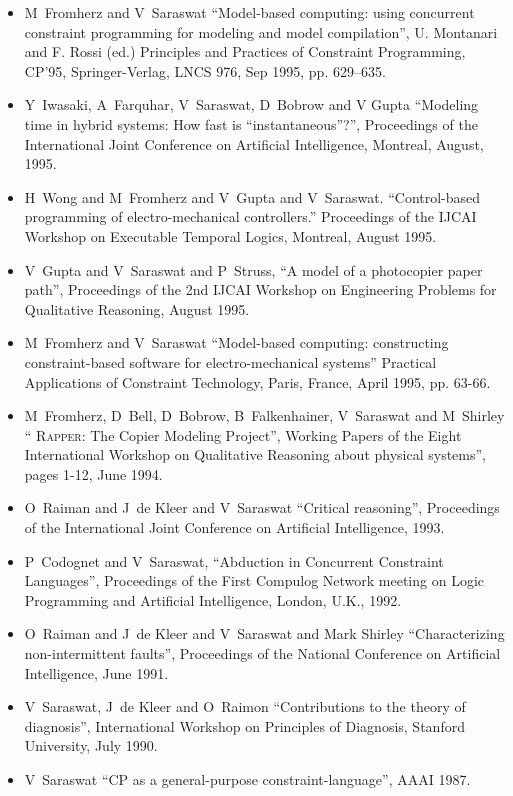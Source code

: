 \documentclass{article}
\begin{document}
\begin{itemize}
\item  M~Fromherz and V~Saraswat   ``Model-based
  computing: using concurrent constraint programming for modeling
  and model compilation'', U. Montanari  and F. Rossi (ed.)
  Principles and Practices of Constraint Programming, CP'95,
  Springer-Verlag, LNCS 976, Sep 1995, pp. 629--635. 

\item  Y~Iwasaki, A~Farquhar, V~Saraswat, D~Bobrow
  and V Gupta ``Modeling time in hybrid systems: How fast is
  ``instantaneous''?'', Proceedings of the International Joint
  Conference on Artificial Intelligence, Montreal, August, 1995.

\item H~Wong and M~Fromherz and V~Gupta and
  V~Saraswat. ``Control-based programming of electro-mechanical 
  controllers.'' Proceedings of the IJCAI Workshop on Executable
  Temporal Logics, Montreal, August 1995.

\item  V~Gupta and V~Saraswat and P~Struss, ``A model
  of a photocopier paper path'', Proceedings of the 2nd IJCAI
  Workshop on Engineering Problems for Qualitative Reasoning,
  August 1995.
  
\item  M~Fromherz and V~Saraswat ``Model-based
  computing: constructing constraint-based software for
  electro-mechanical systems'' Practical Applications of
  Constraint Technology, Paris, France, April 1995, pp. 63-66.

\item M~Fromherz, D~Bell, D~Bobrow, B~Falkenhainer, V~Saraswat and
  M~Shirley ``\textsc{ Rapper}: The Copier Modeling Project'', Working
  Papers of the Eight International Workshop on Qualitative Reasoning
  about physical systems'', pages 1-12, June 1994. 

\item O~Raiman and J~de Kleer and V~Saraswat ``Critical
  reasoning'', Proceedings of the International Joint Conference on
  Artificial Intelligence, 1993.

\item P~Codognet and V~Saraswat, ``Abduction in Concurrent
  Constraint Languages'', Proceedings of the First Compulog Network
  meeting on Logic Programming and Artificial Intelligence, London,
  U.K., 1992.

\item  O~Raiman and J~de Kleer and V~Saraswat and
  Mark Shirley ``Characterizing non-intermittent faults'',
  Proceedings of the National Conference on Artificial
  Intelligence, June 1991.
  
\item V~Saraswat, J~de Kleer and O~Raimon
  ``Contributions to the theory of diagnosis'', International
  Workshop on Principles of Diagnosis, Stanford University, July
  1990.

\item V~Saraswat ``CP as a general-purpose constraint-language'', AAAI 1987.
\end{itemize}
\end{document}
